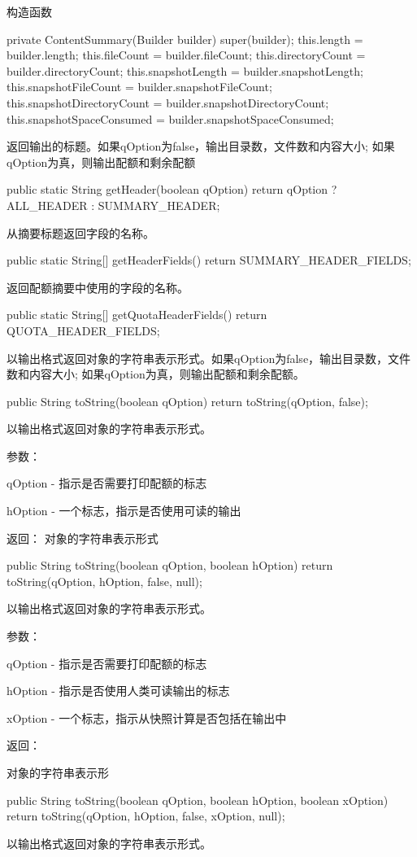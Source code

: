 构造函数
\begin{java}
private ContentSummary(Builder builder) {
  super(builder);
  this.length = builder.length;
  this.fileCount = builder.fileCount;
  this.directoryCount = builder.directoryCount;
  this.snapshotLength = builder.snapshotLength;
  this.snapshotFileCount = builder.snapshotFileCount;
  this.snapshotDirectoryCount = builder.snapshotDirectoryCount;
  this.snapshotSpaceConsumed = builder.snapshotSpaceConsumed;
}
\end{java}
返回输出的标题。如果qOption为false，输出目录数，文件数和内容大小; 如果qOption为真，则输出配额和剩余配额
\begin{java}
public static String getHeader(boolean qOption) {
  return qOption ? ALL_HEADER : SUMMARY_HEADER;
}
\end{java}
从摘要标题返回字段的名称。
\begin{java}
public static String[] getHeaderFields() {
  return SUMMARY_HEADER_FIELDS;
}
\end{java}
返回配额摘要中使用的字段的名称。
\begin{java}
public static String[] getQuotaHeaderFields() {
  return QUOTA_HEADER_FIELDS;
}
\end{java}
以输出格式返回对象的字符串表示形式。如果qOption为false，输出目录数，文件数和内容大小; 如果qOption为真，则输出配额和剩余配额。
\begin{java}
public String toString(boolean qOption) {
  return toString(qOption, false);
}
\end{java}
以输出格式返回对象的字符串表示形式。

参数：

qOption - 指示是否需要打印配额的标志

hOption - 一个标志，指示是否使用可读的输出


返回：
对象的字符串表示形式
\begin{java}
public String toString(boolean qOption, boolean hOption) {
  return toString(qOption, hOption, false, null);
}
\end{java}
以输出格式返回对象的字符串表示形式。

参数：

qOption - 指示是否需要打印配额的标志

hOption - 指示是否使用人类可读输出的标志

xOption - 一个标志，指示从快照计算是否包括在输出中

返回：

对象的字符串表示形
\begin{java}
public String toString(boolean qOption, boolean hOption, boolean xOption) {
  return toString(qOption, hOption, false, xOption, null);
}
\end{java}
以输出格式返回对象的字符串表示形式。

